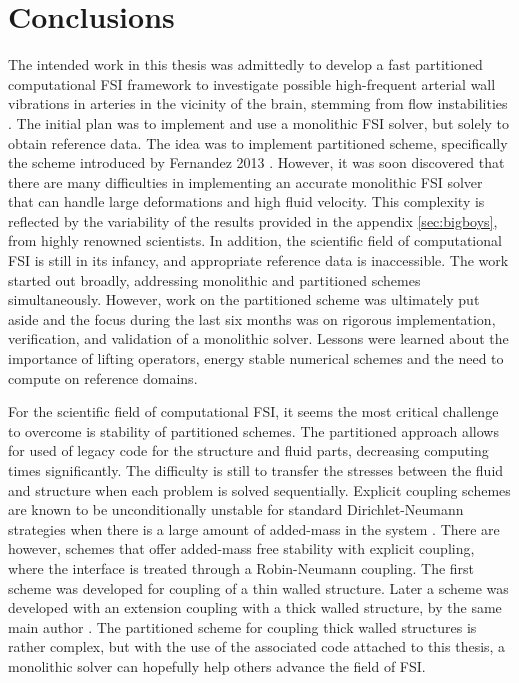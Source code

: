 \chapter{Conclusions}
The intended work in this thesis was admittedly to develop a fast partitioned computational FSI framework to investigate possible high-frequent arterial wall vibrations in arteries in the vicinity of the brain, stemming from flow instabilities \cite{valen2011direct,valen2014mind}. The initial plan was to implement and use a monolithic FSI solver, but solely to obtain reference data. The idea was to implement partitioned scheme, specifically the scheme introduced by Fernandez 2013 \cite{Fernandez2013}. However, it was soon discovered that there are many difficulties in implementing an accurate monolithic FSI solver that can handle large deformations and high fluid velocity. This complexity is reflected by the variability of the results provided in the appendix \ref{sec:bigboys}, from highly renowned scientists. In addition, the scientific field of computational FSI is still in its infancy, and appropriate reference data is inaccessible. The work started out broadly, addressing monolithic and partitioned schemes simultaneously. However, work on the partitioned scheme was ultimately put aside and the focus during the last six months was on rigorous implementation, verification, and validation of a monolithic solver. Lessons were learned about the importance of lifting operators, energy stable numerical schemes and the need to compute on reference domains.

For the scientific field of computational FSI, it seems the most critical challenge to overcome is stability of partitioned schemes. The partitioned approach allows for used of legacy code for the structure and fluid parts, decreasing computing times significantly. The difficulty is still to transfer the stresses between the fluid and structure when each problem is solved sequentially. Explicit coupling schemes are known to be unconditionally unstable for standard Dirichlet-Neumann strategies when there is a large amount of added-mass in the system \cite{Fernandez2015, VanBrummelen2009}. There are however, schemes that offer added-mass free stability with explicit coupling, where the interface is treated through a Robin-Neumann coupling. The first scheme was developed for coupling of a thin walled structure\cite{Fernandez2013}. Later a scheme was developed with an extension coupling with a thick walled structure, by the same main author \cite{Fernandez2015}. The partitioned scheme for coupling thick walled structures is rather complex, but with the use of the associated code attached to this thesis, a monolithic solver can hopefully help others advance the field of FSI. 
